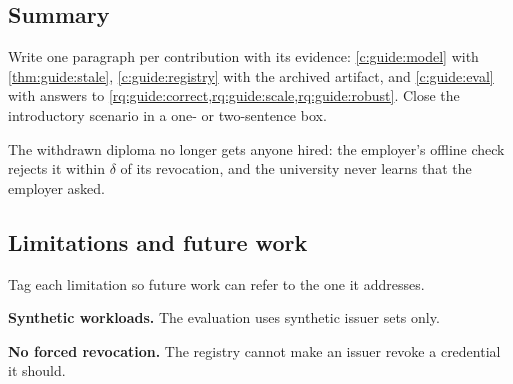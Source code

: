 \subsection[Summary]{Summary\skimmark}\label{app:chapters:summary}
Write one paragraph per contribution with its evidence: \cref{c:guide:model} with \cref{thm:guide:stale}, \cref{c:guide:registry} with the archived artifact, and \cref{c:guide:eval} with answers to \cref{rq:guide:correct,rq:guide:scale,rq:guide:robust}. Close the introductory scenario in a one- or two-sentence box.
\begin{runningexample}[in retrospect]
The withdrawn diploma no longer gets anyone hired: the employer's offline check rejects it within $\delta$ of its revocation, and the university never learns that the employer asked.
\end{runningexample}

\subsection[Limitations and future work]{Limitations and future work\skimmark}\label{app:chapters:future}
Tag each limitation so future work can refer to the one it addresses.
\begin{limitations}
  \item\label{lim:guide:synthetic} \textbf{Synthetic workloads.} The evaluation uses synthetic issuer sets only.
  \item\label{lim:guide:force} \textbf{No forced revocation.} The registry cannot make an issuer revoke a credential it should.
\end{limitations}
